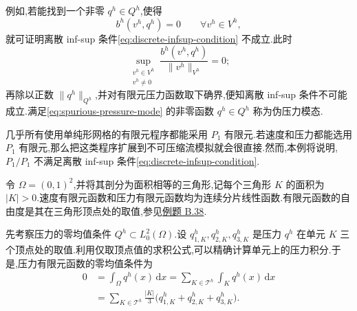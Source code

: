 \begin{note}\label{note:criterion-infsup-failure}
例如,若能找到一个非零 $q^h\in Q^h$,使得
\begin{equation}\label{eq:spurious-pressure-mode}
  b^h(v^h,q^h)=0\qquad\forall v^h\in V^h,
\end{equation}
就可证明离散 inf-sup 条件\cref{eq:discrete-infsup-condition} 不成立.此时
\[
  \sup_{\substack{v^h\in V^h\\v^h\ne0}}
  \frac{b^h(v^h,q^h)}{\|v^h\|_{V^h}}=0;
\]
再除以正数 $\|q^h\|_{Q^h}$,并对有限元压力函数取下确界,便知离散 inf-sup 条件不可能成立.满足\cref{eq:spurious-pressure-mode} 的非零函数 $q^h\in Q^h$ 称为伪压力模态.
\end{note}

\begin{example}[($P_1/P_1$ 有限元空间对)]\label{ex:p1-p1-instability}
几乎所有使用单纯形网格的有限元程序都能采用 $P_1$ 有限元.若速度和压力都能选用 $P_1$ 有限元,那么把这类程序扩展到不可压缩流模拟就会很直接.然而,本例将说明,$P_1/P_1$ 不满足离散 inf-sup 条件\cref{eq:discrete-infsup-condition}.

令 $\Omega=(0,1)^2$,并将其剖分为面积相等的三角形,记每个三角形 $K$ 的面积为 $|K|>0$.速度有限元函数和压力有限元函数均为连续分片线性函数.有限元函数的自由度是其在三角形顶点处的取值,参见\hyperref[ex:appendix-b-38]{例题 B.38}.

先考察压力的零均值条件 $Q^h\subset L_0^2(\Omega)$.设 $q^h_{1,K},q^h_{2,K},q^h_{3,K}$ 是压力 $q^h$ 在单元 $K$ 三个顶点处的取值.利用仅取顶点值的求积公式,可以精确计算单元上的压力积分.于是,压力有限元函数的零均值条件为
\begin{equation}\label{eq:p1p1-pressure-mean}
  \begin{aligned}
    0&=\int_\Omega q^h(x)\,\mathrm{d}x
      =\sum_{K\in\mathcal{T}^h}\int_K q^h(x)\,\mathrm{d}x\\
     &=\sum_{K\in\mathcal{T}^h}\frac{|K|}{3}
       \bigl(q^h_{1,K}+q^h_{2,K}+q^h_{3,K}\bigr).
  \end{aligned}
\end{equation}


\end{example}
